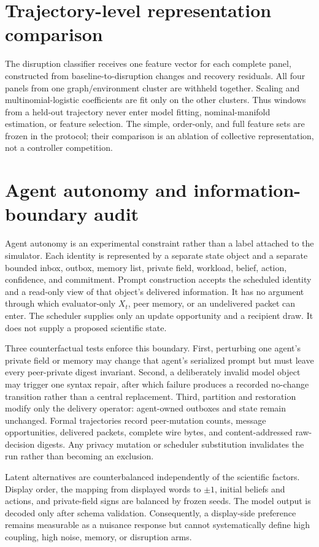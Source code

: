 \documentclass[12pt]{article}
\begin{document}
\section{Trajectory-level representation comparison}

The disruption classifier receives one feature vector for each complete
panel, constructed from baseline-to-disruption changes and recovery residuals.
All four panels from one graph/environment cluster are withheld together.
Scaling and multinomial-logistic coefficients are fit only on the other
clusters. Thus windows from a held-out trajectory never enter model fitting,
nominal-manifold estimation, or feature selection. The simple, order-only, and
full feature sets are frozen in the protocol; their comparison is an ablation
of collective representation, not a controller competition.

\section{Agent autonomy and information-boundary audit}

Agent autonomy is an experimental constraint rather than a label attached to
the simulator.  Each identity is represented by a separate state object and a
separate bounded inbox, outbox, memory list, private field, workload, belief,
action, confidence, and commitment.  Prompt construction accepts the scheduled
identity and a read-only view of that object's delivered information.  It has no
argument through which evaluator-only $X_t$, peer memory, or an undelivered
packet can enter.  The scheduler supplies only an update opportunity and a
recipient draw.  It does not supply a proposed scientific state.

Three counterfactual tests enforce this boundary.  First, perturbing one
agent's private field or memory may change that agent's serialized prompt but
must leave every peer-private digest invariant.  Second, a deliberately invalid
model object may trigger one syntax repair, after which failure produces a
recorded no-change transition rather than a central replacement.  Third,
partition and restoration modify only the delivery operator: agent-owned
outboxes and state remain unchanged.  Formal trajectories record peer-mutation
counts, message opportunities, delivered packets, complete wire bytes, and
content-addressed raw-decision digests.  Any privacy mutation or scheduler
substitution invalidates the run rather than becoming an exclusion.

Latent alternatives are counterbalanced independently of the scientific
factors.  Display order, the mapping from displayed words to $\pm1$, initial
beliefs and actions, and private-field signs are balanced by frozen seeds.  The
model output is decoded only after schema validation.  Consequently, a
display-side preference remains measurable as a nuisance response but cannot
systematically define high coupling, high noise, memory, or disruption arms.
\end{document}
